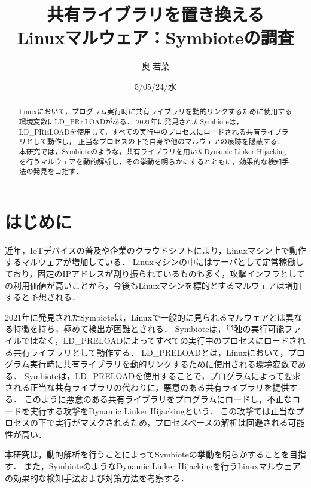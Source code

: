 \documentclass[submit,techreq,noauthor]{eco}	%
\begin{document}
\date   {5/05/24/水}				%
\title  {共有ライブラリを置き換える\\Linuxマルウェア：Symbioteの調査}	%
\author {奥 若菜}				%


\begin{abstract}
	Linuxにおいて，プログラム実行時に共有ライブラリを動的リンクするために使用する環境変数にLD\_PRELOADがある．
  2021年に発見されたSymbioteは，LD\_PRELOADを使用して，すべての実行中のプロセスにロードされる共有ライブラリとして動作し，
  正当なプロセスの下で自身や他のマルウェアの痕跡を隠蔽する．
  本研究では，Symbioteのような，共有ライブラリを用いたDynamic Linker Hijackingを行うマルウェアを動的解析し，その挙動を明らかにするとともに，効果的な検知手法の発見を目指す．
\end{abstract}
\maketitle


\section{はじめに}
近年，IoTデバイスの普及や企業のクラウドシフトにより，Linuxマシン上で動作するマルウェアが増加している\cite{TREND-MICRO}．
Linuxマシンの中にはサーバとして定常稼働しており，固定のIPアドレスが割り振られているものも多く，攻撃インフラとしての利用価値が高いことから，今後もLinuxマシンを標的とするマルウェアは増加すると予想される．

2021年に発見されたSymbioteは，Linuxで一般的に見られるマルウェアとは異なる特徴を持ち，極めて検出が困難とされる\cite{Symbiote}．
Symbioteは，単独の実行可能ファイルではなく，LD\_PRELOADによってすべての実行中のプロセスにロードされる共有ライブラリとして動作する．
LD\_PRELOADとは，Linuxにおいて，プログラム実行時に共有ライブラリを動的リンクするために使用される環境変数である．
Symbioteは，LD\_PRELOADを使用することで，プログラムによって要求される正当な共有ライブラリの代わりに，悪意のある共有ライブラリを提供する．
このように悪意のある共有ライブラリをプログラムにロードし，不正なコードを実行する攻撃をDynamic Linker Hijackingという\cite{MITRE-ATT&CK}．
この攻撃では正当なプロセスの下で実行がマスクされるため，プロセスベースの解析は回避される可能性が高い．

本研究は，動的解析を行うことによってSymbioteの挙動を明らかすることを目指す．
また，SymbioteのようなDynamic Linker Hijackingを行うLinuxマルウェアの効果的な検知手法および対策方法を考察する．
\end{document}
